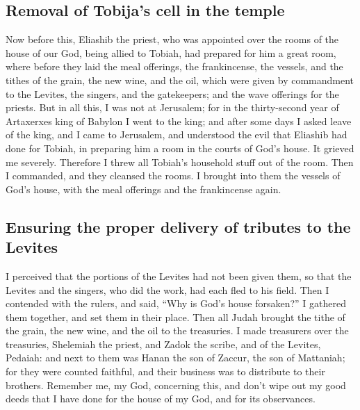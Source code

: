 \hypertarget{removal-of-tobijas-cell-in-the-temple}{%
\subsection{Removal of Tobija's cell in the
temple}\label{removal-of-tobijas-cell-in-the-temple}}

 Now before this, Eliashib the priest, who was appointed
over the rooms of the house of our God, being allied to Tobiah,
 had prepared for him a great room, where before they laid
the meal offerings, the frankincense, the vessels, and the tithes of the
grain, the new wine, and the oil, which were given by commandment to the
Levites, the singers, and the gatekeepers; and the wave offerings for
the priests.  But in all this, I was not at Jerusalem; for
in the thirty-second year of Artaxerxes king of Babylon I went to the
king; and after some days I asked leave of the king,  and
I came to Jerusalem, and understood the evil that Eliashib had done for
Tobiah, in preparing him a room in the courts of God's house.
 It grieved me severely. Therefore I threw all Tobiah's
household stuff out of the room.  Then I commanded, and
they cleansed the rooms. I brought into them the vessels of God's house,
with the meal offerings and the frankincense again.

\hypertarget{ensuring-the-proper-delivery-of-tributes-to-the-levites}{%
\subsection{Ensuring the proper delivery of tributes to the
Levites}\label{ensuring-the-proper-delivery-of-tributes-to-the-levites}}

 I perceived that the portions of the Levites had not
been given them, so that the Levites and the singers, who did the work,
had each fled to his field.  Then I contended with the
rulers, and said, ``Why is God's house forsaken?'' I gathered them
together, and set them in their place.  Then all Judah
brought the tithe of the grain, the new wine, and the oil to the
treasuries.  I made treasurers over the treasuries,
Shelemiah the priest, and Zadok the scribe, and of the Levites, Pedaiah:
and next to them was Hanan the son of Zaccur, the son of Mattaniah; for
they were counted faithful, and their business was to distribute to
their brothers.  Remember me, my God, concerning this,
and don't wipe out my good deeds that I have done for the house of my
God, and for its observances.

